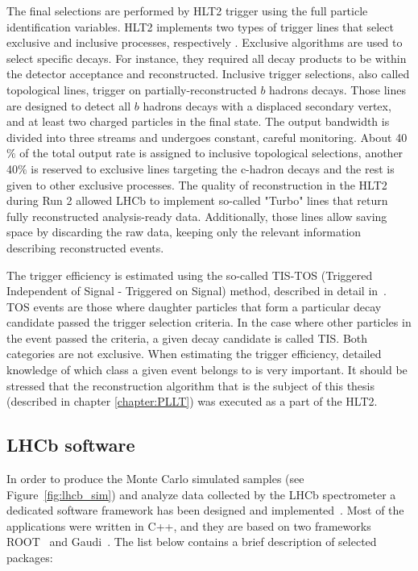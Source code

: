 The final selections are performed by HLT2 trigger using the full particle identification variables. HLT2 implements two types of trigger lines that select exclusive and inclusive processes, respectively . Exclusive algorithms are used to select specific decays. For instance, they required all decay products to be within the detector acceptance and reconstructed. 
Inclusive trigger selections, also called topological lines, trigger on partially-reconstructed $b$ hadrons decays. Those lines are designed to detect all $b$ hadrons decays with a displaced secondary vertex, and at least two charged particles in the final state. The output bandwidth is divided into three streams and undergoes constant, careful monitoring. About 40$\%$ of the total output rate is assigned to inclusive topological selections, another 40$\%$ is reserved to exclusive lines targeting the c-hadron decays and the rest is given to other exclusive processes.
The quality of reconstruction in the HLT2 during Run 2 allowed LHCb to implement so-called "Turbo" lines that return fully reconstructed analysis-ready data. Additionally, those lines allow saving space by discarding the raw data, keeping only the relevant information describing reconstructed events. 

The trigger efficiency is estimated using the so-called TIS-TOS (Triggered Independent of Signal - Triggered on Signal) method, described in detail in~\cite{trigger_eff}. TOS events are those where daughter particles that form a particular decay candidate passed the trigger selection criteria. In the case where other particles in the event passed the criteria, a given decay candidate is called TIS.
Both categories are not exclusive. When estimating the trigger efficiency, detailed knowledge of which class a given event belongs to is very important.
It should be stressed that the reconstruction algorithm that is the subject of this thesis (described in chapter \ref{chapter:PLLT}) was executed as a part of the HLT2. 

\subsection{LHCb software}

In order to produce the Monte Carlo simulated samples (see Figure~\ref{fig:lhcb_sim}) and analyze data collected by the LHCb spectrometer a dedicated software framework has been designed and implemented~\cite{lhcb_software}. Most of the applications were written in  C++, and they are based on two frameworks ROOT~\cite{root} and Gaudi~\cite{gaudi}. The list below contains a brief description of selected packages:

